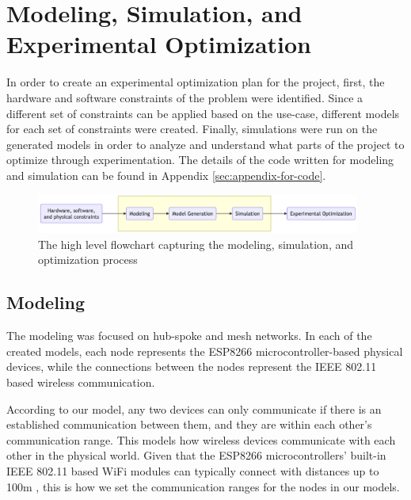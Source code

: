\section{Modeling, Simulation, and Experimental Optimization}

In order to create an experimental optimization plan for the project, first, the hardware and software constraints of the problem were identified. Since a different set of constraints can be applied based on the use-case, different models for each set of constraints were created. Finally, simulations were run on the generated models in order to analyze and understand what parts of the project to optimize through experimentation. The details of the code written for modeling and simulation can be found in Appendix \ref{sec:appendix-for-code}.

\begin{figure}[H]
    \centering
    \includegraphics[width=0.95\textwidth]{images/mod_sim_flowchart.png}
    \caption{The high level flowchart capturing the modeling, simulation, and optimization process}
    \label{fig:mod-sim-flowchart}

\end{figure}

\subsection{Modeling}
The modeling was focused on hub-spoke and mesh networks. In each of the created models, each node represents the ESP8266 microcontroller-based physical devices, while the connections between the nodes represent the IEEE 802.11 based wireless communication. 


According to our model, any two devices can only communicate if there is an established communication between them, and they are within each other's communication range. This models how wireless devices communicate with each other in the physical world. Given that the ESP8266 microcontrollers' built-in IEEE 802.11 based WiFi modules can typically connect with distances up to 100m \cite{chabukswardesign}, this is how we set the communication ranges for the nodes in our models.

